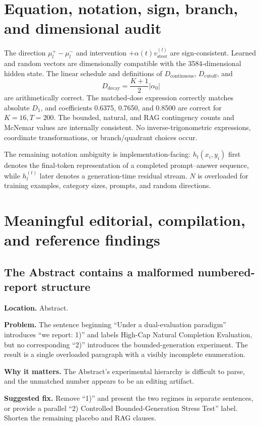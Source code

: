 \documentclass[11pt]{article}
\newcommand{\findinglabel}[1]{\textbf{#1}}
\begin{document}
\section*{Equation, notation, sign, branch, and dimensional audit}

The direction $\mu_l^+-\mu_l^-$ and intervention $+\alpha(t)v_{\text{steer}}^{(l)}$ are sign-consistent.  Learned and random vectors are dimensionally compatible with the 3584-dimensional hidden state.  The linear schedule and definitions of $D_{\text{continuous}}$, $D_{\text{cutoff}}$, and
\[
D_{\text{decay}}=\frac{K+1}{2}|\alpha_0|
\]
are arithmetically correct.  The matched-dose expression correctly matches absolute $D_1$, and coefficients 0.6375, 0.7650, and 0.8500 are correct for $K=16,T=200$.  The bounded, natural, and RAG contingency counts and McNemar values are internally consistent.  No inverse-trigonometric expressions, coordinate transformations, or branch/quadrant choices occur.

The remaining notation ambiguity is implementation-facing: $h_l(x_i,y_i)$ first denotes the final-token representation of a completed prompt--answer sequence, while $h_l^{(t)}$ later denotes a generation-time residual stream.  $N$ is overloaded for training examples, category sizes, prompts, and random directions.

\section*{Meaningful editorial, compilation, and reference findings}

\subsection*{The Abstract contains a malformed numbered-report structure}

\findinglabel{Location.} Abstract.

\findinglabel{Problem.} The sentence beginning ``Under a dual-evaluation paradigm'' introduces ``we report: 1)'' and labels High-Cap Natural Completion Evaluation, but no corresponding ``2)'' introduces the bounded-generation experiment.  The result is a single overloaded paragraph with a visibly incomplete enumeration.

\findinglabel{Why it matters.} The Abstract's experimental hierarchy is difficult to parse, and the unmatched number appears to be an editing artifact.

\findinglabel{Suggested fix.} Remove ``1)'' and present the two regimes in separate sentences, or provide a parallel ``2) Controlled Bounded-Generation Stress Test'' label.  Shorten the remaining placebo and RAG clauses.
\end{document}
